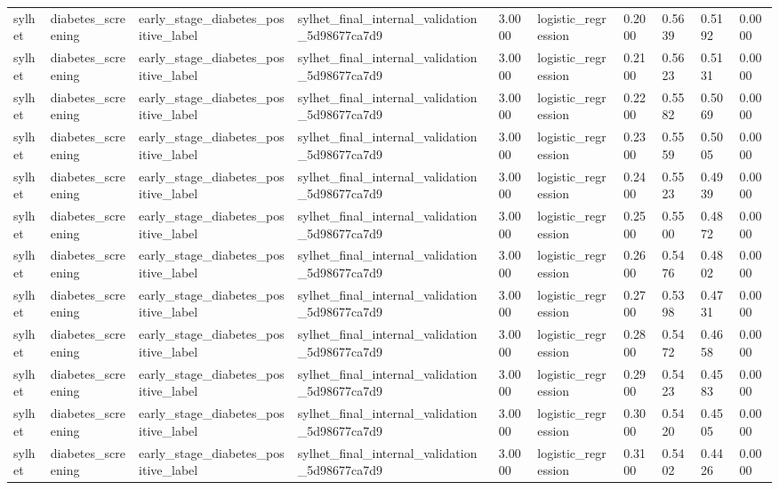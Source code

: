 \begin{tabular}{llllllllll}
sylhet & diabetes\_screening & early\_stage\_diabetes\_positive\_label & sylhet\_final\_internal\_validation\_5d98677ca7d9 & 3.0000 & logistic\_regression & 0.2000 & 0.5639 & 0.5192 & 0.0000 \\
sylhet & diabetes\_screening & early\_stage\_diabetes\_positive\_label & sylhet\_final\_internal\_validation\_5d98677ca7d9 & 3.0000 & logistic\_regression & 0.2100 & 0.5623 & 0.5131 & 0.0000 \\
sylhet & diabetes\_screening & early\_stage\_diabetes\_positive\_label & sylhet\_final\_internal\_validation\_5d98677ca7d9 & 3.0000 & logistic\_regression & 0.2200 & 0.5582 & 0.5069 & 0.0000 \\
sylhet & diabetes\_screening & early\_stage\_diabetes\_positive\_label & sylhet\_final\_internal\_validation\_5d98677ca7d9 & 3.0000 & logistic\_regression & 0.2300 & 0.5559 & 0.5005 & 0.0000 \\
sylhet & diabetes\_screening & early\_stage\_diabetes\_positive\_label & sylhet\_final\_internal\_validation\_5d98677ca7d9 & 3.0000 & logistic\_regression & 0.2400 & 0.5523 & 0.4939 & 0.0000 \\
sylhet & diabetes\_screening & early\_stage\_diabetes\_positive\_label & sylhet\_final\_internal\_validation\_5d98677ca7d9 & 3.0000 & logistic\_regression & 0.2500 & 0.5500 & 0.4872 & 0.0000 \\
sylhet & diabetes\_screening & early\_stage\_diabetes\_positive\_label & sylhet\_final\_internal\_validation\_5d98677ca7d9 & 3.0000 & logistic\_regression & 0.2600 & 0.5476 & 0.4802 & 0.0000 \\
sylhet & diabetes\_screening & early\_stage\_diabetes\_positive\_label & sylhet\_final\_internal\_validation\_5d98677ca7d9 & 3.0000 & logistic\_regression & 0.2700 & 0.5398 & 0.4731 & 0.0000 \\
sylhet & diabetes\_screening & early\_stage\_diabetes\_positive\_label & sylhet\_final\_internal\_validation\_5d98677ca7d9 & 3.0000 & logistic\_regression & 0.2800 & 0.5472 & 0.4658 & 0.0000 \\
sylhet & diabetes\_screening & early\_stage\_diabetes\_positive\_label & sylhet\_final\_internal\_validation\_5d98677ca7d9 & 3.0000 & logistic\_regression & 0.2900 & 0.5423 & 0.4583 & 0.0000 \\
sylhet & diabetes\_screening & early\_stage\_diabetes\_positive\_label & sylhet\_final\_internal\_validation\_5d98677ca7d9 & 3.0000 & logistic\_regression & 0.3000 & 0.5420 & 0.4505 & 0.0000 \\
sylhet & diabetes\_screening & early\_stage\_diabetes\_positive\_label & sylhet\_final\_internal\_validation\_5d98677ca7d9 & 3.0000 & logistic\_regression & 0.3100 & 0.5402 & 0.4426 & 0.0000 \\

\end{tabular}
